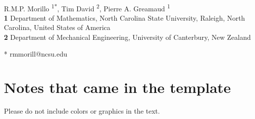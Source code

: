 \documentclass[10pt,letterpaper]{article}
\begin{document}
	\vspace*{0.2in}
	\begin{flushleft}
		{\Large
			\textbf{} 
		}
		\newline
		\\
		R.M.P. Morillo \textsuperscript{1*},
		Tim David \textsuperscript{2},
		Pierre A. Greamaud \textsuperscript{1}
		\\
		\bigskip
		\textbf{1} Department of Mathematics, North Carolina State University, Raleigh, North Carolina, United States of America
		\\
		\textbf{2} Department of Mechanical Engineering, University of Canterbury, New Zealand
		\\
		\bigskip
		
		
		
		
		
		
		* rmmorill@ncsu.edu
		
	\end{flushleft}
	
	\section*{\textinterrobang Notes that came in the template}
	Please do not include colors or graphics in the text.
	
\end{document}
